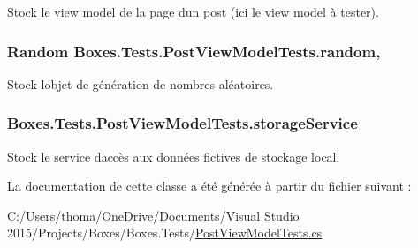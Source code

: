 Stock le view model de la page d\textquotesingle{}un post (ici le view model à tester). 

\subsubsection[{\texorpdfstring{random}{random}}]{\setlength{\rightskip}{0pt plus 5cm}Random Boxes.\+Tests.\+Post\+View\+Model\+Tests.\+random\hspace{0.3cm}{\ttfamily [static]}, {\ttfamily [private]}}\hypertarget{class_boxes_1_1_tests_1_1_post_view_model_tests_a0178160fe934f0058e0bb8cf3488a11a}{}\label{class_boxes_1_1_tests_1_1_post_view_model_tests_a0178160fe934f0058e0bb8cf3488a11a}


Stock l\textquotesingle{}objet de génération de nombres aléatoires. 

\subsubsection[{\texorpdfstring{storage\+Service}{storageService}}]{ Boxes.\+Tests.\+Post\+View\+Model\+Tests.\+storage\+Service\hspace{0.3cm}{\ttfamily [private]}}\hypertarget{class_boxes_1_1_tests_1_1_post_view_model_tests_a67b486930efd04ec1543f6977ae0fcab}{}\label{class_boxes_1_1_tests_1_1_post_view_model_tests_a67b486930efd04ec1543f6977ae0fcab}


Stock le service d\textquotesingle{}accès aux données fictives de stockage local. 



La documentation de cette classe a été générée à partir du fichier suivant \+:\begin{DoxyCompactItemize}
\item 
C\+:/\+Users/thoma/\+One\+Drive/\+Documents/\+Visual Studio 2015/\+Projects/\+Boxes/\+Boxes.\+Tests/\hyperlink{_post_view_model_tests_8cs}{Post\+View\+Model\+Tests.\+cs}\end{DoxyCompactItemize}

